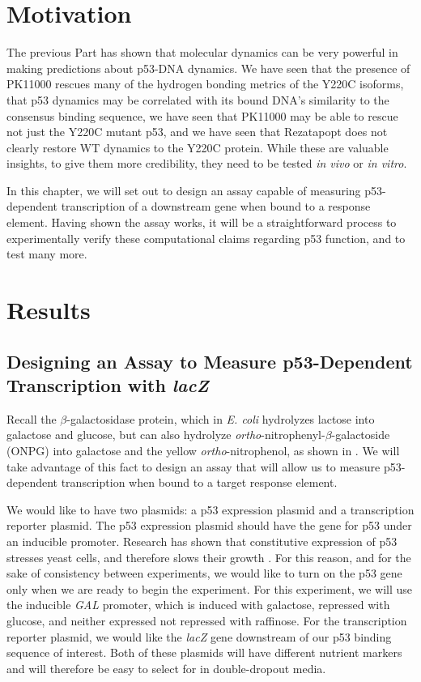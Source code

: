 \section{Motivation}

The previous Part has shown that molecular dynamics can be very powerful in making predictions about p53-DNA dynamics. We have seen that the presence of PK11000 rescues many of the hydrogen bonding metrics of the Y220C isoforms, that p53 dynamics may be correlated with its bound DNA's similarity to the consensus binding sequence, we have seen that PK11000 may be able to rescue not just the Y220C mutant p53, and we have seen that Rezatapopt does not clearly restore WT dynamics to the Y220C protein. While these are valuable insights, to give them more credibility, they need to be tested \textit{in vivo} or \textit{in vitro}.

In this chapter, we will set out to design an assay capable of measuring p53-dependent transcription of a downstream gene when bound to a response element. Having shown the assay works, it will be a straightforward process to experimentally verify these computational claims regarding p53 function, and to test many more.

\section{Results}

\subsection{Designing an Assay to Measure p53-Dependent Transcription with \textit{lacZ}}

Recall the \(\beta\)-galactosidase protein, which in \textit{E. coli} hydrolyzes lactose into galactose and glucose, but can also hydrolyze \textit{ortho}-nitrophenyl-\(\beta\)-galactoside (ONPG) into galactose and the yellow \textit{ortho}-nitrophenol, as shown in . We will take advantage of this fact to design an assay that will allow us to measure p53-dependent transcription when bound to a target response element.

We would like to have two plasmids: a p53 expression plasmid and a transcription reporter plasmid. The p53 expression plasmid should have the gene for p53 under an inducible promoter. Research has shown that constitutive expression of p53 stresses yeast cells, and therefore slows their growth \parencite{ingaNovelHumanP532001}. For this reason, and for the sake of consistency between experiments, we would like to turn on the p53 gene only when we are ready to begin the experiment. For this experiment, we will use the inducible \textit{GAL} promoter, which is induced with galactose, repressed with glucose, and neither expressed not repressed with raffinose. For the transcription reporter plasmid, we would like the \textit{lacZ} gene downstream of our p53 binding sequence of interest. Both of these plasmids will have different nutrient markers and will therefore be easy to select for in double-dropout media.

